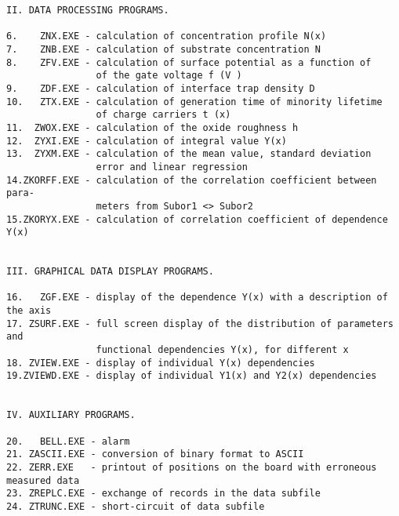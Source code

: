 \begin{verbatim}
II. DATA PROCESSING PROGRAMS.

6.    ZNX.EXE - calculation of concentration profile N(x)
7.    ZNB.EXE - calculation of substrate concentration N
8.    ZFV.EXE - calculation of surface potential as a function of 
                of the gate voltage f (V )
9.    ZDF.EXE - calculation of interface trap density D
10.   ZTX.EXE - calculation of generation time of minority lifetime 
                of charge carriers t (x)
11.  ZWOX.EXE - calculation of the oxide roughness h
12.  ZYXI.EXE - calculation of integral value Y(x)
13.  ZYXM.EXE - calculation of the mean value, standard deviation
                error and linear regression
14.ZKORFF.EXE - calculation of the correlation coefficient between para-
                meters from Subor1 <> Subor2
15.ZKORYX.EXE - calculation of correlation coefficient of dependence Y(x)


III. GRAPHICAL DATA DISPLAY PROGRAMS.

16.   ZGF.EXE - display of the dependence Y(x) with a description of the axis
17. ZSURF.EXE - full screen display of the distribution of parameters and
                functional dependencies Y(x), for different x
18. ZVIEW.EXE - display of individual Y(x) dependencies
19.ZVIEWD.EXE - display of individual Y1(x) and Y2(x) dependencies


IV. AUXILIARY PROGRAMS.

20.   BELL.EXE - alarm
21. ZASCII.EXE - conversion of binary format to ASCII
22. ZERR.EXE   - printout of positions on the board with erroneous measured data
23. ZREPLC.EXE - exchange of records in the data subfile
24. ZTRUNC.EXE - short-circuit of data subfile
\end{verbatim}
